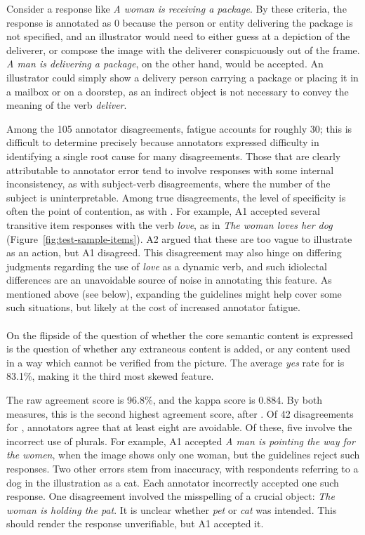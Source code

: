 Consider a response like \textit{A woman is receiving a package}.  By these criteria, the response is annotated as 0 because the person or entity delivering the package is not specified, and an illustrator would need to either guess at a depiction of the deliverer, or compose the image with the deliverer conspicuously out of the frame. \textit{A man is delivering a package}, on the other hand, would be accepted. An illustrator could simply show a delivery person carrying a package or placing it in a mailbox or on a doorstep, as an indirect object is not necessary to convey the meaning of the verb \textit{deliver}.

Among the 105 annotator disagreements, fatigue accounts for roughly 30; this is difficult to determine precisely because annotators expressed difficulty in identifying a single root cause for many disagreements. Those that are clearly attributable to annotator error tend to involve responses with some internal inconsistency, as with subject-verb disagreements, where the number of the subject is uninterpretable. Among true disagreements, the level of specificity is often the point of contention, as with . For example, A1 accepted several transitive item responses with the verb \textit{love}, as in \textit{The woman loves her dog} (Figure~\ref{fig:test-sample-items}). A2 argued that these are too vague to illustrate as an action, but A1 disagreed. This disagreement may also hinge on differing judgments regarding the use of \textit{love} as a dynamic verb, and such idiolectal differences are an unavoidable source of noise in annotating this feature. As mentioned above (see  below), expanding the guidelines might help cover some such situations, but likely at the cost of increased annotator fatigue.

\paragraph{} On the flipside of the question of whether the core semantic content is expressed is the question of whether any extraneous content is added, or any content used in a way which cannot be verified from the picture.  The average \textit{yes} rate for  is 83.1\%, making it the third most skewed feature.

The raw agreement score is 96.8\%, and the kappa score is 0.884. By both measures, this is the second highest agreement score, after . Of 42 disagreements for , annotators agree that at least eight are avoidable. Of these, five involve the incorrect use of plurals. For example, A1 accepted \textit{A man is pointing the way for the women}, when the image shows only one woman, but the guidelines reject such responses. Two other errors stem from inaccuracy, with respondents referring to a dog in the illustration as a cat. Each annotator incorrectly accepted one such response. One disagreement involved the misspelling of a crucial object: \textit{The woman is holding the pat}. It is unclear whether \textit{pet} or \textit{cat} was intended. This should render the response unverifiable, but A1 accepted it.

